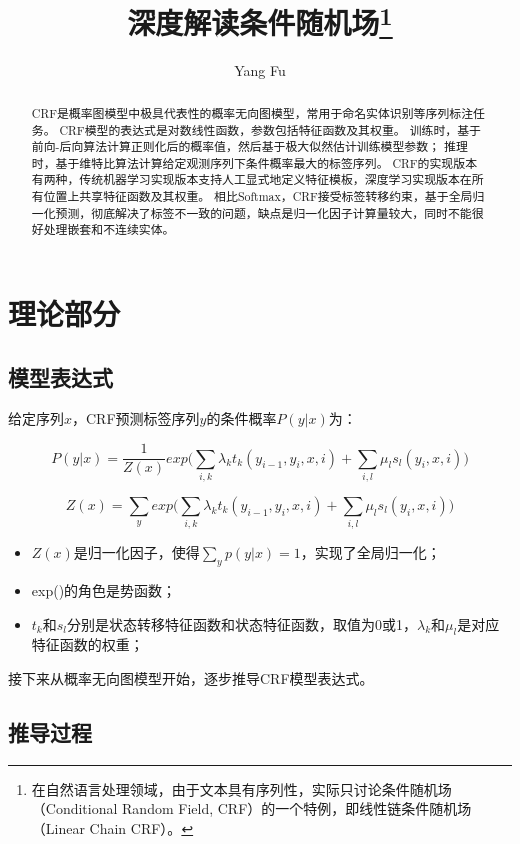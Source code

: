 \documentclass[]{article}
\title{深度解读条件随机场\footnote{在自然语言处理领域，由于文本具有序列性，实际只讨论条件随机场（Conditional Random Field, CRF）的一个特例，即线性链条件随机场（Linear Chain CRF）。}}
\author{Yang Fu}
\begin{document}
\maketitle

\begin{abstract}
CRF是概率图模型中极具代表性的概率无向图模型，常用于命名实体识别等序列标注任务。
CRF模型的表达式是对数线性函数，参数包括特征函数及其权重。
训练时，基于前向-后向算法计算正则化后的概率值，然后基于极大似然估计训练模型参数；
推理时，基于维特比算法计算给定观测序列下条件概率最大的标签序列。
CRF的实现版本有两种，传统机器学习实现版本支持人工显式地定义特征模板，深度学习实现版本在所有位置上共享特征函数及其权重。
相比Softmax，CRF接受标签转移约束，基于全局归一化预测，彻底解决了标签不一致的问题，缺点是归一化因子计算量较大，同时不能很好处理嵌套和不连续实体。
\end{abstract}

\section{理论部分}

\subsection{模型表达式}

给定序列$x$，CRF预测标签序列$y$的条件概率$P(y|x)$为：

\begin{equation}\label{key}
	P(y|x) = \frac{1}{Z(x)}exp \bigg(\sum_{i,k}\lambda_k t_k(y_{i-1}, y_i, x, i) + \sum_{i, l}\mu_l s_l(y_i, x, i)\bigg)
\end{equation}

\begin{equation}\label{key}
	Z(x) = \sum_{y} exp\bigg(\sum_{i,k} \lambda_k t_k(y_{i-1}, y_i, x, i) + \sum_{i,l} \mu_l s_l(y_i, x, i)\bigg)
\end{equation}

\begin{itemize}
	\item $Z(x)$是归一化因子，使得$\sum_y p(y|x) = 1$，实现了全局归一化；
	\item exp()的角色是势函数；
	\item $t_k$和$s_l$分别是状态转移特征函数和状态特征函数，取值为0或1，$\lambda_k$和$\mu_l$是对应特征函数的权重；
\end{itemize}

接下来从概率无向图模型开始，逐步推导CRF模型表达式。

\subsection{推导过程}
\end{document}
